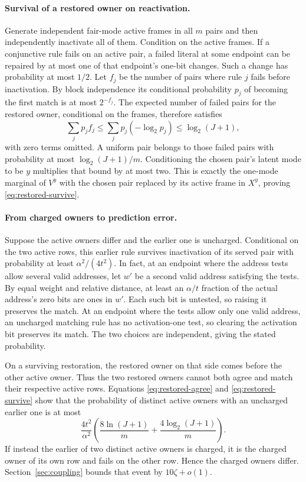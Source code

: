 \documentclass[11pt]{article}
\begin{document}
\paragraph{Survival of a restored owner on reactivation.}
Generate independent fair-mode active frames in all $m$ pairs and
then independently inactivate all of them. Condition on the active
frames. If a conjunctive rule fails on an active pair, a failed
literal at some endpoint can be repaired by at most one of that
endpoint's one-bit changes. Such a change has probability at most
$1/2$. Let $f_j$ be the number of pairs where rule $j$ fails before
inactivation. By block independence its conditional probability
$p_j$ of becoming the first match is at most $2^{-f_j}$. The
expected number of failed pairs for the restored owner, conditional
on the frames, therefore satisfies
\[
  \sum_j p_j f_j\le \sum_j p_j(-\log_2 p_j)\le\log_2(J+1),
\]
with zero terms omitted. A uniform pair belongs to those failed
pairs with probability at most $\log_2(J+1)/m$. Conditioning
the chosen pair's latent mode to be $y$ multiplies that bound
by at most two. This is exactly the one-mode marginal of $V^y$
with the chosen pair replaced by its active frame in $X^y$,
proving \eqref{eq:restored-survive}.

\paragraph{From charged owners to prediction error.}
Suppose the active owners differ and the earlier one is uncharged.
Conditional on the two active rows, this earlier rule survives
inactivation of its served pair with probability at least
$\alpha^2/(4t^2)$. In fact, at an endpoint where the address tests
allow several valid addresses, let $w'$ be a second valid address
satisfying the tests. By equal weight and relative distance, at
least an $\alpha/t$ fraction of the actual address's zero bits
are ones in $w'$. Each such bit is untested, so raising it
preserves the match. At an endpoint where the tests allow only
one valid address, an uncharged matching rule has no activation-one
test, so clearing the activation bit preserves its match. The
two choices are independent, giving the stated probability.

On a surviving restoration, the restored owner on that side comes
before the other active owner. Thus the two restored owners cannot
both agree and match their respective active rows. Equations
\eqref{eq:restored-agree} and \eqref{eq:restored-survive} show that
the probability of distinct active owners with an uncharged earlier
one is at most
\[
  \frac{4t^2}{\alpha^2}
  \left(\frac{8\ln(J+1)}{m}+\frac{4\log_2(J+1)}{m}\right).
\]
If instead the earlier of two distinct active owners is charged, it
is the charged owner of its own row and fails on the other row.
Hence the charged owners differ. Section~\ref{sec:coupling} bounds
that event by $10\zeta+o(1)$.
\end{document}
